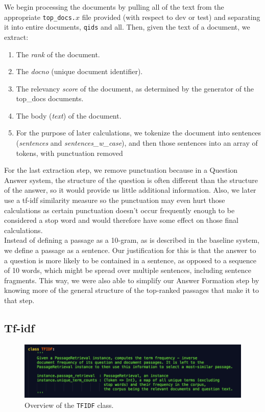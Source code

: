 \documentclass{article}
\begin{document}
We begin processing the documents by pulling all of the text from the appropriate \texttt{top\_docs.$x$} file provided (with respect to dev or test) and separating it into entire documents, \texttt{qids} and all. Then, given the text of a document, we extract:
\begin{enumerate}
\item The \textit{rank} of the document.
\item The \textit{docno} (unique document identifier).
\item The relevancy \textit{score} of the document, as determined by the generator of the top\_docs documents.
\item The body (\textit{text}) of the document.
\item For the purpose of later calculations, we tokenize the document into sentences (\textit{sentences} and \textit{sentences\_w\_case}), and then those sentences into an array of tokens, with punctuation removed
\end{enumerate}

For the last extraction step, we remove punctuation because in a Question Answer system, the structure of the question is often different than the structure of the answer, so it would provide us little additional information. Also, we later use a tf-idf similarity measure so the punctuation may even hurt those calculations as certain punctuation doesn't occur frequently enough to be considered a stop word and would therefore have some effect on those final calculations.\\

Instead of defining a passage as a 10-gram, as is described in the baseline system, we define a passage as a sentence. Our justification for this is that the answer to a question is more likely to be contained in a sentence, as opposed to a sequence of 10 words, which might be spread over multiple sentences, including sentence fragments. This way, we were also able to simplify our Answer Formation step by knowing more of the general structure of the top-ranked passages that make it to that step.

\subsection{Tf-idf}
\begin{figure}[h]
    \centering
    \includegraphics[width=1.0\textwidth]{images/tfidf.png}
    \caption{Overview of the \texttt{TFIDF} class.}
\end{figure}
\end{document}
